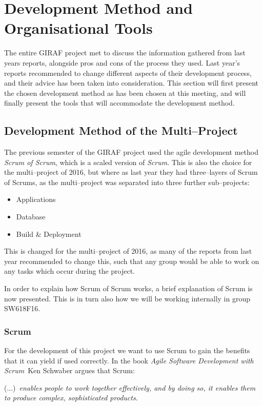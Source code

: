 \section{Development Method and Organisational Tools}
The entire GIRAF project met to discuss the information gathered from last years reports, alongside pros and cons of the process they used.
Last year's reports recommended to change different aspects of their development process, and their advice has been taken into consideration.
This section will first present the chosen development method as has been chosen at this meeting, and will finally present the tools that will accommodate the development method.


\subsection{Development Method of the Multi--Project}\label{devmethod}
The previous semester of the GIRAF project used the agile development method \textit{Scrum of Scrum}, which is a scaled version of \textit{Scrum}.
This is also the choice for the multi--project of 2016, but where as last year they had three--layers of Scrum of Scrums, as the multi--project was separated into three further sub--projects:
\begin{itemize}
	\item Applications
	\item Database
	\item Build \& Deployment
\end{itemize}

This is changed for the multi--project of 2016, as many of the reports from last year recommended to change this, such that any group would be able to work on any tasks which occur during the project.

In order to explain how Scrum of Scrum works, a brief explanation of Scrum is now presented.
This is in turn also how we will be working internally in group SW618F16.

\subsubsection{Scrum}\label{scrum}

For the development of this project we want to use Scrum to gain the benefits that it can yield if used correctly.
In the book \textit{Agile Software Development with Scrum}\cite{scrumbookschwaber}~Ken Schwaber argues that Scrum:
\begin{displayquote}
(...)~\textit{enables people to work together effectively, and by doing so, it enables them to produce complex, sophisticated products.}
\end{displayquote}

